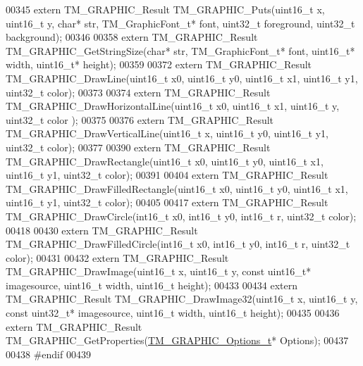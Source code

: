 \begin{DoxyCode}
00345 \textcolor{keyword}{extern} TM\_GRAPHIC\_Result TM\_GRAPHIC\_Puts(uint16\_t x, uint16\_t y, \textcolor{keywordtype}{char}* str, TM\_GraphicFont\_t* font, 
      uint32\_t foreground, uint32\_t background);
00346 
00358 \textcolor{keyword}{extern} TM\_GRAPHIC\_Result TM\_GRAPHIC\_GetStringSize(\textcolor{keywordtype}{char}* str, TM\_GraphicFont\_t* font, uint16\_t* width, 
      uint16\_t* height);
00359 
00372 \textcolor{keyword}{extern} TM\_GRAPHIC\_Result TM\_GRAPHIC\_DrawLine(uint16\_t x0, uint16\_t y0, uint16\_t x1, uint16\_t y1, uint32\_t 
      color);
00373 
00374 \textcolor{keyword}{extern} TM\_GRAPHIC\_Result TM\_GRAPHIC\_DrawHorizontalLine(uint16\_t x0, uint16\_t x1, uint16\_t y, uint32\_t color
      );
00375 
00376 \textcolor{keyword}{extern} TM\_GRAPHIC\_Result TM\_GRAPHIC\_DrawVerticalLine(uint16\_t x, uint16\_t y0, uint16\_t y1, uint32\_t color);
00377 
00390 \textcolor{keyword}{extern} TM\_GRAPHIC\_Result TM\_GRAPHIC\_DrawRectangle(uint16\_t x0, uint16\_t y0, uint16\_t x1, uint16\_t y1, 
      uint32\_t color);
00391 
00404 \textcolor{keyword}{extern} TM\_GRAPHIC\_Result TM\_GRAPHIC\_DrawFilledRectangle(uint16\_t x0, uint16\_t y0, uint16\_t x1, uint16\_t y1,
       uint32\_t color);
00405 
00417 \textcolor{keyword}{extern} TM\_GRAPHIC\_Result TM\_GRAPHIC\_DrawCircle(int16\_t x0, int16\_t y0, int16\_t r, uint32\_t color);
00418 
00430 \textcolor{keyword}{extern} TM\_GRAPHIC\_Result TM\_GRAPHIC\_DrawFilledCircle(int16\_t x0, int16\_t y0, int16\_t r, uint32\_t color);
00431 
00432 \textcolor{keyword}{extern} TM\_GRAPHIC\_Result TM\_GRAPHIC\_DrawImage(uint16\_t x, uint16\_t y, \textcolor{keyword}{const} uint16\_t* imagesource, uint16\_t
       width, uint16\_t height);
00433 
00434 \textcolor{keyword}{extern} TM\_GRAPHIC\_Result TM\_GRAPHIC\_DrawImage32(uint16\_t x, uint16\_t y, \textcolor{keyword}{const} uint32\_t* imagesource, 
      uint16\_t width, uint16\_t height);
00435 
00436 \textcolor{keyword}{extern} TM\_GRAPHIC\_Result TM\_GRAPHIC\_GetProperties(\hyperlink{struct_t_m___g_r_a_p_h_i_c___options__t}{TM\_GRAPHIC\_Options\_t}* Options);
00437 
00438 \textcolor{preprocessor}{#endif}
00439 
\end{DoxyCode}
